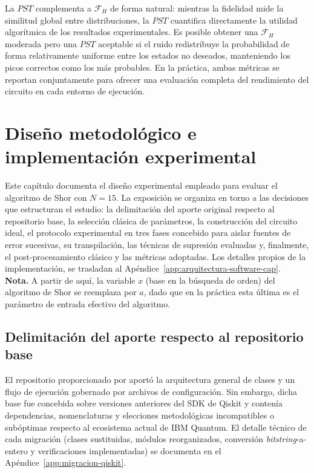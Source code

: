 \documentclass[12pt, spanish]{book}
\begin{document}
La $PST$ complementa a $\mathcal{F}_H$ de forma natural: mientras la fidelidad mide la similitud global entre distribuciones, la $PST$ cuantifica directamente la utilidad algorítmica de los resultados experimentales. Es posible obtener una $\mathcal{F}_H$ moderada pero una $PST$ aceptable si el ruido redistribuye la probabilidad de forma relativamente uniforme entre los estados no deseados, manteniendo los picos correctos como los más probables. En la práctica, ambas métricas se reportan conjuntamente para ofrecer una evaluación completa del rendimiento del circuito en cada entorno de ejecución.



\chapter{Diseño metodológico e implementación experimental}
\label{chap:metodologia}

Este capítulo documenta el diseño experimental empleado para evaluar el algoritmo de Shor con $N = 15$. La exposición se organiza en torno a las decisiones que estructuran el estudio: la delimitación del aporte original respecto al repositorio base, la selección clásica de parámetros, la construcción del circuito ideal, el protocolo experimental en tres fases concebido para aislar fuentes de error sucesivas, su transpilación, las técnicas de supresión evaluadas y, finalmente, el post-procesamiento clásico y las métricas adoptadas. Los detalles propios de la implementación, se trasladan al Apéndice~\ref{app:arquitectura-software-cap}.\\

\textbf{Nota.} A partir de aquí, la variable $x$ (base en la búsqueda de orden) del algoritmo de Shor se reemplaza por $a$, dado que en la práctica esta última es el parámetro de entrada efectivo del algoritmo.

\section{Delimitación del aporte respecto al repositorio base}
\label{sec:aporte_original}

El repositorio proporcionado por \cite{villarreal} aportó la arquitectura general de clases y un flujo de ejecución gobernado por archivos de configuración. Sin embargo, dicha base fue concebida sobre versiones anteriores del SDK de Qiskit y contenía dependencias, nomenclaturas y elecciones metodológicas incompatibles o subóptimas respecto al ecosistema actual de IBM Quantum. El detalle técnico de cada migración (clases sustituidas, módulos reorganizados, conversión \textit{bitstring}-a-entero y verificaciones implementadas) se documenta en el Apéndice~\ref{app:migracion-qiskit}.
\end{document}
